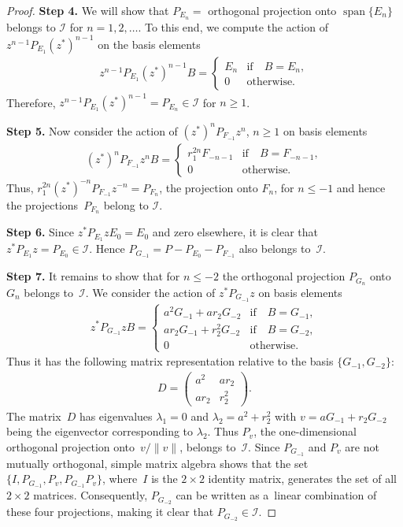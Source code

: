 \begin{proof}
{\bf Step 4.} We will show that $P_{E_n}= $ orthogonal projection onto $\operatorname{span}\{E_n\}$ belongs to $\mathcal I$ for $n=1,2,
\dots$.
To this end, we compute the action of $z^{n-1} P_{E_1} (z^*)^{n-1}$ on the basis elements
\begin{gather*}
z^{n-1} P_{E_1} (z^*)^{n-1} B=
\begin{cases}
E_n & \text{if}\quad  B=E_n,
\\
0 & \text{otherwise.}
\end{cases}
\end{gather*}
Therefore, $z^{n-1} P_{E_1} (z^*)^{n-1}= P_{E_n} \in \mathcal I$ for $n \geq 1$.

{\bf Step 5.} Now consider the action of $(z^*)^n P_{F_{-1}} z^n$, $n \geq 1$ on basis elements
\begin{gather*}
(z^*)^n P_{F_{-1}} z^n B=
\begin{cases}
r_1^{2n}F_{-n-1} & \text{if}\quad  B=F_{-n-1},
\\
0 & \text{otherwise.}
\end{cases}
\end{gather*}
Thus, $r_1^{2n}(z^*)^{-n} P_{F_{-1}} z^{-n}= P_{F_n}$, the projection onto $F_n$, for $n \leq -1$ and hence the
projec\-tions~$P_{F_n}$ belong to $\mathcal I$.

{\bf Step 6.} Since $z^* P_{E_1}z E_0=E_0$ and zero elsewhere, it is clear that $z^* P_{E_1}z =P_{E_0} \in \mathcal I$.
Hence $P_{G_{-1}}= P- P_{E_0}- P_{F_{-1}}$ also belongs to~$\mathcal I$.

{\bf Step 7.} It remains to show that for $n \leq -2$ the orthogonal projection $P_{G_n}$ onto $G_n$ belongs to~$\mathcal I$.
We consider the action of $z^* P_{G_{-1}}z$ on basis elements
\begin{gather*}
z^* P_{G_{-1}}z B=
\begin{cases}
a^2 G_{-1}+ar_2G_{-2} & \text{if}\quad  B=G_{-1},
\\
ar_2 G_{-1}+r_2^2G_{-2} & \text{if}\quad  B= G_{-2},
\\
0 & \text{otherwise}.
\end{cases}
\end{gather*}
Thus it has the following matrix representation relative to the basis $\{G_{-1}, G_{-2}\}$:
\begin{gather*}
D=\left(
\begin{matrix}
a^2 & ar_2
\\
ar_2 & r_2^2
\end{matrix}
\right).
\end{gather*}
The matrix~$D$ has eigenvalues $\lambda_1=0$ and $\lambda_2= a^2+r_2^2$ with $v= aG_{-1}+ r_2 G_{-2}$ being the
eigenvector corresponding to $\lambda_2$.
Thus $P_{v}$, the one-dimensional orthogonal projection onto~$v/\|v\|$, belongs to~$\mathcal I$.
Since $P_{G_{-1}}$ and $P_{v}$ are not mutually orthogonal, simple matrix algebra shows that the set $\{I, P_{G_{-1}},
P_{v}, P_{G_{-1}}P_{v}\}$, where~$I$ is the $2 \times 2$ identity matrix, generates the set of all $2 \times 2 $
matrices.
Consequently, $P_{G_{-2}}$ can be written as a~linear combination of these four projections, making it clear that
$P_{G_{-2}} \in \mathcal I$.


\end{proof}
